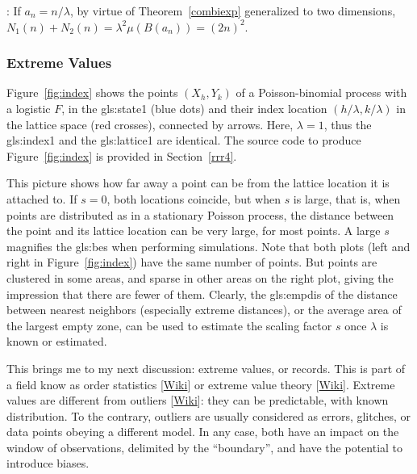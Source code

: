 \documentclass[10pt]{article}
\begin{document}
: If $a_n=n/\lambda$, by virtue of Theorem~\ref{combiexp} generalized to two dimensions, $N_1(n)+N_2(n)= \lambda^2 \mu(B(a_n))= (2n)^2$.


\subsubsection{Extreme Values}\label{sev45}

Figure~\ref{fig:index} shows the points $(X_h,Y_k)$ of a Poisson-binomial process with a logistic $F$, in the \gls{gls:state1} (blue dots) and their
index location $(h/\lambda,k/\lambda)$ in the lattice space (red crosses), connected by arrows. Here, $\lambda=1$, thus the \gls{gls:index1} and the \gls{gls:lattice1} are identical.  The source code to produce Figure~\ref{fig:index} is provided in Section~\ref{rrr4}.

This picture shows how far away a point can be from the lattice location it is attached to. If $s=0$, both locations coincide, but when $s$ is large, that is, when points are distributed as in
a \textcolor{index}{stationary Poisson process},  the distance between the point and its lattice location can be very large, for most points. A large $s$ magnifies the
\glspl{gls:be} when performing simulations.
Note that both plots (left and right in Figure~\ref{fig:index}) have the same number of points. But points are clustered in some areas, and sparse in other areas on the right plot, giving the impression that there are fewer of them. Clearly, the  \gls{gls:empdis} of  the distance between nearest neighbors (especially extreme distances), or the average area of the largest empty zone, can be used to estimate the \textcolor{index}{scaling factor} $s$ once $\lambda$ is known or estimated.

This brings me to my next discussion: \textcolor{index}{extreme values}, or \textcolor{index}{records}. This is part of a field know as
\textcolor{index}{order statistics} [\href{https://en.wikipedia.org/wiki/Order_statistic}{Wiki}] or extreme value theory [\href{https://en.wikipedia.org/wiki/Extreme_value_theory}{Wiki}]. Extreme values are different from \textcolor{index}{outliers} [\href{https://en.wikipedia.org/wiki/Outlier}{Wiki}]:
they can be predictable, with known distribution. To the contrary, outliers are usually considered as errors, glitches, or data points obeying a different model. In any case, both have an impact
on the window of observations, delimited by the ``boundary'', and have the potential to introduce biases.
\end{document}
